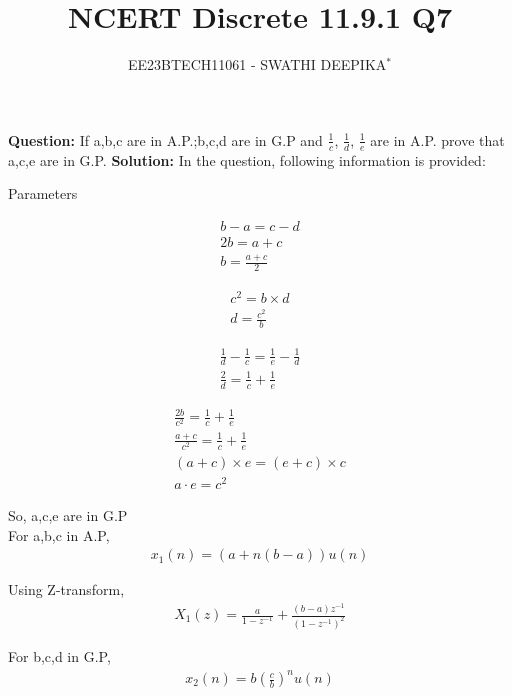 \documentclass[journal,12pt,twocolumn]{IEEEtran}
\title{
	
\title{NCERT Discrete 11.9.1 Q7}
\author{EE23BTECH11061 - SWATHI DEEPIKA$^{*}$%
}


}
\providecommand{\brak}[1]{\ensuremath{\left(#1\right)}}
\theoremstyle{remark}
\newcommand{\solution}{\noindent \textbf{Solution: }}
\begin{document}
\maketitle

\textbf{Question:} 
If a,b,c are in A.P.;b,c,d are in G.P and $\frac{1}{c}$, $\frac{1}{d}$, $\frac{1}{e}$ are in A.P. prove that a,c,e are in G.P.
\solution
In the question, following information is provided:
 \begin{table}[h]
 	\centering
 	\resizebox{6 cm}{!}{
 		
 	}
 	\vspace{6 pt}
 	\caption{Parameters}
 	\label{tab:swa_tabel} 
 \end{table}

 
\begin{align}
b-a = c-d\\
2b=a+c\\
b=\frac{a+c}{2}
\end{align}

\begin{align}
c^2 = b\times d\\
d= \frac{c^2}{b}
\end{align}

\begin{align}
\frac{1}{d} - \frac{1}{c} = \frac{1}{e} - \frac{1}{d}\\
\frac{2}{d} = \frac{1}{c} + \frac{1}{e}
\end{align}

\begin{align}
\frac{2b}{c^2} = \frac{1}{c} + \frac{1}{e}\\
\frac{a+c}{c^2} = \frac{1}{c} + \frac{1}{e}\\
(a+c)\times e = (e+c)\times c\\
a \cdot e = c^2
\end{align}

So, a,c,e are in G.P\\


For a,b,c in A.P,
\begin{align}
x_1(n) = (a + n(b-a))u(n)
\end{align}

Using Z-transform, 
\begin{align}
X_1(z) = \frac{a}{1-z^{-1}} + \frac{(b-a)z^{-1}}{(1-z^{-1})^2}
\end{align}

For b,c,d in G.P,
\begin{align}
x_2(n) = b\brak{\frac{c}{b}}^n u(n)
\end{align}
\end{document}
